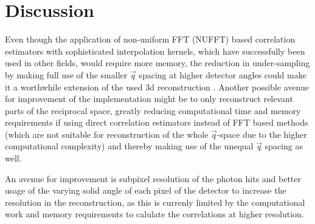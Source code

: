 \chapter{Discussion}
Even though the application of non-uniform FFT (NUFFT) based correlation estimators with sophisticated interpolation kernels, which have  successfully been used in other fields, would require more memory, the reduction in under-sampling by making full use of the smaller $\vec{q}$ spacing at higher detector angles could make it a worthwhile extension of the used 3d reconstruction \cite{laguna1998,yang2008,chang2020}. Another possible avenue for improvement of the implementation might be to only reconstruct relevant parts of the reciprocal space, greatly reducing computational time and memory requirements if using direct correlation estimators instead of FFT based methods (which are not suitable for reconstruction of the whole $\vec{q}$-space due to the higher computational complexity) and thereby making use of the unequal $\vec{q}$ spacing as well.



An avenue for improvement is subpixel resolution of the photon hits and better usage of the varying solid angle of each pixel of the detector to increase the resolution in the reconstruction, as this is currenly limited by the computational work and memory requirements to calulate the correlations at higher resolution.